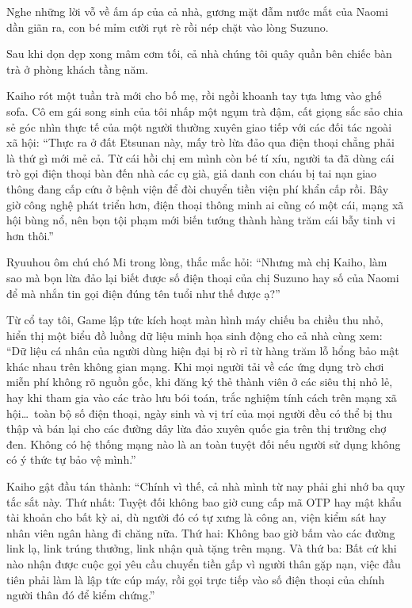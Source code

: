 \documentclass[../main.tex]{subfiles}
\begin{document}
Nghe những lời vỗ về ấm áp của cả nhà, gương mặt đẫm nước mắt của Naomi dần giãn ra, con bé mỉm cười rụt rè rồi nép chặt vào lòng Suzuno.

\ct

Sau khi dọn dẹp xong mâm cơm tối, cả nhà chúng tôi quây quần bên chiếc bàn trà ở phòng khách tầng năm.

Kaiho rót một tuần trà mới cho bố mẹ, rồi ngồi khoanh tay tựa lưng vào ghế sofa. Cô em gái song sinh của tôi nhấp một ngụm trà đậm, cất giọng sắc sảo chia sẻ góc nhìn thực tế của một người thường xuyên giao tiếp với các đối tác ngoài xã hội: ``Thực ra ở đất Etsunan này, mấy trò lừa đảo qua điện thoại chẳng phải là thứ gì mới mẻ cả. Từ cái hồi chị em mình còn bé tí xíu, người ta đã dùng cái trò gọi điện thoại bàn đến nhà các cụ già, giả danh con cháu bị tai nạn giao thông đang cấp cứu ở bệnh viện để đòi chuyển tiền viện phí khẩn cấp rồi. Bây giờ công nghệ phát triển hơn, điện thoại thông minh ai cũng có một cái, mạng xã hội bùng nổ, nên bọn tội phạm mới biến tướng thành hàng trăm cái bẫy tinh vi hơn thôi.''

Ryuuhou ôm chú chó Mi trong lòng, thắc mắc hỏi: ``Nhưng mà chị Kaiho, làm sao mà bọn lừa đảo lại biết được số điện thoại của chị Suzuno hay số của Naomi để mà nhắn tin gọi điện đúng tên tuổi như thế được ạ?''

Từ cổ tay tôi, Game lập tức kích hoạt màn hình máy chiếu ba chiều thu nhỏ, hiển thị một biểu đồ luồng dữ liệu minh họa sinh động cho cả nhà cùng xem: ``Dữ liệu cá nhân của người dùng hiện đại bị rò rỉ từ hàng trăm lỗ hổng bảo mật khác nhau trên không gian mạng. Khi mọi người tải về các ứng dụng trò chơi miễn phí không rõ nguồn gốc, khi đăng ký thẻ thành viên ở các siêu thị nhỏ lẻ, hay khi tham gia vào các trào lưu bói toán, trắc nghiệm tính cách trên mạng xã hội\dots\ toàn bộ số điện thoại, ngày sinh và vị trí của mọi người đều có thể bị thu thập và bán lại cho các đường dây lừa đảo xuyên quốc gia trên thị trường chợ đen. Không có hệ thống mạng nào là an toàn tuyệt đối nếu người sử dụng không có ý thức tự bảo vệ mình.''

Kaiho gật đầu tán thành: ``Chính vì thế, cả nhà mình từ nay phải ghi nhớ ba quy tắc sắt này. Thứ nhất: Tuyệt đối không bao giờ cung cấp mã OTP hay mật khẩu tài khoản cho bất kỳ ai, dù người đó có tự xưng là công an, viện kiểm sát hay nhân viên ngân hàng đi chăng nữa. Thứ hai: Không bao giờ bấm vào các đường link lạ, link trúng thưởng, link nhận quà tặng trên mạng. Và thứ ba: Bất cứ khi nào nhận được cuộc gọi yêu cầu chuyển tiền gấp vì người thân gặp nạn, việc đầu tiên phải làm là lập tức cúp máy, rồi gọi trực tiếp vào số điện thoại của chính người thân đó để kiểm chứng.''
\end{document}
